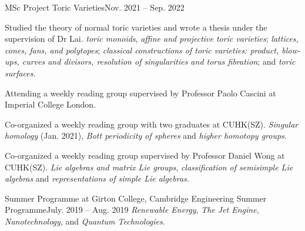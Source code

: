 \HeadingItemListStart
	\HeadingItem
		{MSc Project}{}
		{Toric Varieties}{Nov. 2021 -- Sep. 2022}
		\ItemListStart
			\item Studied the theory of normal toric varieties and wrote a thesis under the supervision of Dr Lai.
				{\textit{toric monoids}, \textit{affine and projective toric varieties};
				\textit{lattices, cones, fans, and polytopes};
				\textit{classical constructions of toric varieties: product, blow-ups, curves and divisors, resolution of singularities and torus fibration};
				 and \textit{toric surfaces}.}
		\ItemListEnd

		\ItemListStart
			\item Attending a weekly reading group supervised by Professor Paolo Cascini at Imperial College London.
		\ItemListEnd
		\ItemListStart
			\item Co-organized a weekly reading group with two graduates at CUHK(SZ).
				{\textit{Singular homology} (Jan. 2021), \textit{Bott periodicity of spheres} and \textit{higher homotopy groups}.}
		\ItemListEnd
		\ItemListStart
			\item Co-organized a weekly reading group supervised by Professor Daniel Wong at CUHK(SZ).
				{\textit{Lie algebras and matrix Lie groups},
				\textit{classification of semisimple Lie algebras}
				and \textit{representations of simple Lie algebras}.}
		\ItemListEnd

	\HeadingItem
		{Summer Programme at Girton College, Cambridge}{}
		{Engineering Summer Programme}{July. 2019 -- Aug. 2019}
		\ItemListStart
				{\textit{Renewable Energy}, \textit{The Jet Engine}, \textit{Nanotechnology}, and \textit{Quantum Technologies}.}
		\ItemListEnd
		
\HeadingItemListEnd

